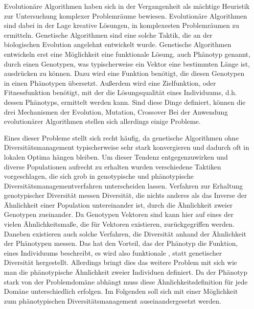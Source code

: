 Evolutionäre Algorithmen haben sich in der Vergangenheit als mächtige Heuristik zur Untersuchung komplexer Problemräume bewiesen.
Evolutionäre Algorithmen sind dabei in der Lage kreative Lösungen, in komplexesten Problemräumen zu ermitteln.
Genetische Algorithmen sind eine solche Taktik, die an der biologischen Evolution angelehnt entwickelt wurde.
Genetische Algorithmen entwickeln erst eine Möglichkeit eine funktionale Lösung, auch Phänotyp genannt, durch einen Genotypen, was typischerweise ein Vektor eine bestimmten Länge ist, ausdrücken zu können.
Dazu wird eine Funktion benötigt, die diesen Genotypen in einen Phänotypen übersetzt.
Außerdem wird eine Zielfunktion, oder Fitnessfunktion benötigt, mit der die Lösungsqualität eines Individuums, d.h. dessen Phänotyps, ermittelt werden kann.
Sind diese Dinge definiert, können die drei Mechanismen der Evolution, Mutation, Crossover
Bei der Anwendung evolutionärer Algorithmen stellen sich allerdings einige Probleme.

Eines dieser Probleme stellt sich recht häufig, da genetische Algorithmen ohne Diversitätsmanagement typischerweise sehr stark konvergieren und dadurch oft in lokalen Optima hängen bleiben.
Um dieser Tendenz entgegenzuwirken und diverse Populationen aufrecht zu erhalten wurden verschiedene Taktiken vorgeschlagen, die sich grob in genotypische und phänotypische Diversitätsmanagementverfahren unterscheiden lassen.
Verfahren zur Erhaltung genotypischer Diversität messen Diversität, die nichts anderes als das Inverse der Ähnlichkeit einer Population untereinander ist, durch die Ähnlichkeit zweier Genotypen zueinander.
Da Genotypen Vektoren sind kann hier auf eines der vielen Ähnlichkeitsmaße, die für Vektoren existieren, zurückgegriffen werden.
Daneben existieren auch solche Verfahren, die Diversität anhand der Ähnlichkeit der Phänotypen messen.
Das hat den Vorteil, das der Phänotyp die Funktion, eines Individuums beschreibt, es wird also funktionale , statt genetischer Diversität hergestellt.
Allerdings bringt dies das weitere Problem mit sich wie man die phänotypische Ähnlichkeit zweier Individuen definiert.
Da der Phänotyp stark von der Problemdomäne abhängt muss diese Ähnlichkeitsdefinition für jede Domäne unterschiedlich erfolgen.
Im Folgenden soll sich mit einer Möglichkeit zum phänotypischen Diversitätsmanagement auseinandergesetzt werden.

